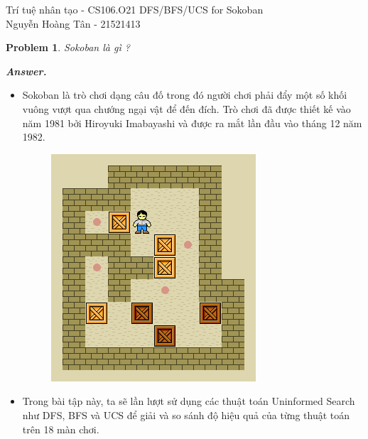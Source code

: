 \documentclass[12pt]{article}
\newtheorem{problem}{Problem}
\newenvironment{solution}[1][\it{Answer}]{\textbf{#1. } }{}
\begin{document}
\graphicspath{ {Figs/} } 

\noindent Trí tuệ nhân tạo - CS106.O21 \hfill DFS/BFS/UCS for Sokoban \\
Nguyễn Hoàng Tân - 21521413

\hrulefill


\begin{problem}
	Sokoban là gì ?
\end{problem}
\begin{solution}
	\begin{itemize}
		\item Sokoban là trò chơi dạng câu đố trong đó người chơi phải
		đẩy một số khối vuông vượt qua chướng ngại vật để đến đích. Trò chơi đã
		được thiết kế vào năm 1981 bởi Hiroyuki Imabayashi và được ra mắt lần
		đầu vào tháng 12 năm 1982.
		\begin{figure}[h]
			\centering
			\includegraphics[scale=0.5]{frame_17_delay-0.2s.png}
		
		\end{figure}
		\item Trong bài tập này, ta sẽ lần lượt sử dụng các thuật toán Uninformed
		Search như DFS, BFS và UCS để giải và so sánh độ hiệu quả của từng thuật toán trên 18 màn chơi.
	\end{itemize}
\end{solution} 
\end{document}
